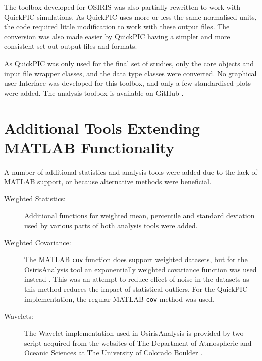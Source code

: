 The toolbox developed for OSIRIS was also partially rewritten to work with QuickPIC simulations.
As QuickPIC uses more or less the same normalised units, the code required little modification to work with these output files.
The conversion was also made easier by QuickPIC having a simpler and more consistent set out output files and formats.

As QuickPIC was only used for the final set of studies, only the core objects and input file wrapper classes, and the data type classes were converted.
No graphical user Interface was developed for this toolbox, and only a few standardised plots were added.
The analysis toolbox is available on GitHub \cite{code:quickpic_analysis:2017}.

\section{Additional Tools Extending MATLAB Functionality}
\label{Tools:OAAdd}

A number of additional statistics and analysis tools were added due to the lack of MATLAB support, or because alternative methods were beneficial.

\begin{description}
    \item[Weighted Statistics:] Additional functions for weighted mean, percentile and standard deviation used by various parts of both analysis tools were added.
    \item[Weighted Covariance:] The MATLAB \texttt{cov} function does support weighted datasets, but for the OsirisAnalysis tool an exponentially weighted covariance function was used instead \cite{pozzi:2012}.
    This was an attempt to reduce effect of noise in the datasets as this method reduces the impact of statistical outliers.
    For the QuickPIC implementation, the regular MATLAB \texttt{cov} method was used.
    \item[Wavelets:] The Wavelet implementation used in OsirisAnalysis is provided by two script acquired from the websites of The Department of Atmospheric and Oceanic Sciences at The University of Colorado Boulder \cite{torrence:1998}.
\end{description}

